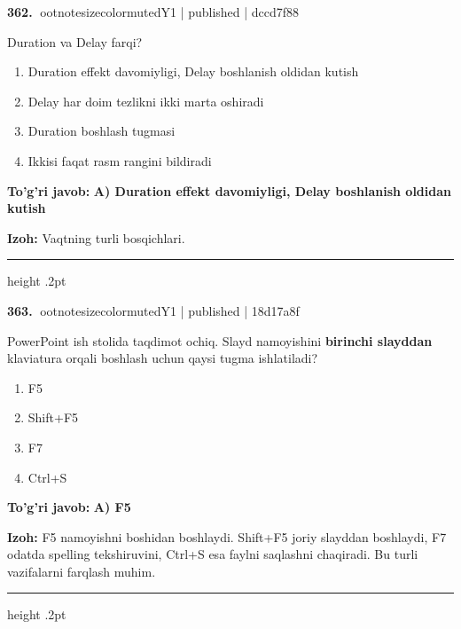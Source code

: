 \documentclass[10pt,a4paper]{article}
\begin{document}
\textbf{\color{ink}362.} {ootnotesizecolor{muted}Y1 | published | dccd7f88}
\par
Duration va Delay farqi?
\begin{enumerate}[label=\Alph*),leftmargin=9mm]
\item Duration effekt davomiyligi, Delay boshlanish oldidan kutish
\item Delay har doim tezlikni ikki marta oshiradi
\item Duration boshlash tugmasi
\item Ikkisi faqat rasm rangini bildiradi
\end{enumerate}
\begin{tcolorbox}[enhanced,breakable,colback=teal!4,colframe=teal!55!black,boxrule=0.45pt,arc=1.2mm,left=2.8mm,right=2.8mm,top=2mm,bottom=2mm]
\textbf{\color{teal}To'g'ri javob:} \textbf{A) Duration effekt davomiyligi, Delay boshlanish oldidan kutish}
\par\smallskip
\textbf{Izoh:} Vaqtning turli bosqichlari.
\end{tcolorbox}
\vspace{2mm}\hrule height .2pt\vspace{2mm}

\textbf{\color{ink}363.} {ootnotesizecolor{muted}Y1 | published | 18d17a8f}
\par
PowerPoint ish stolida taqdimot ochiq. Slayd namoyishini \textbf{birinchi slayddan} klaviatura orqali boshlash uchun qaysi tugma ishlatiladi?
\begin{enumerate}[label=\Alph*),leftmargin=9mm]
\item F5
\item Shift+F5
\item F7
\item Ctrl+S
\end{enumerate}
\begin{tcolorbox}[enhanced,breakable,colback=teal!4,colframe=teal!55!black,boxrule=0.45pt,arc=1.2mm,left=2.8mm,right=2.8mm,top=2mm,bottom=2mm]
\textbf{\color{teal}To'g'ri javob:} \textbf{A) F5}
\par\smallskip
\textbf{Izoh:} F5 namoyishni boshidan boshlaydi. Shift+F5 joriy slayddan boshlaydi, F7 odatda spelling tekshiruvini, Ctrl+S esa faylni saqlashni chaqiradi. Bu turli vazifalarni farqlash muhim.
\end{tcolorbox}
\vspace{2mm}\hrule height .2pt\vspace{2mm}
\end{document}
